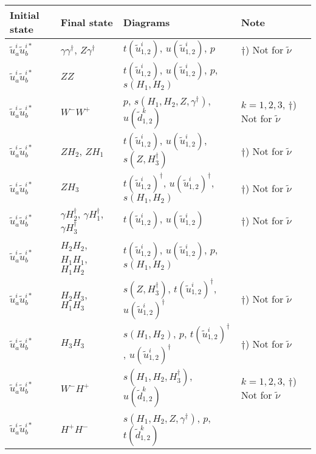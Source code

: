 {\small
\begin{center}
\begin{tabular}{llll} \hline
{\bfseries Initial state} & {\bfseries Final state} &
{\bfseries Diagrams} & {\bfseries Note} \\ \hline \tabspace
$\tilde{u}^i_a \tilde{u}^{i*}_{b}$ & $\gamma \gamma^\dagger$, $Z \gamma^\dagger$ &
$t(\tilde{u}^i_{1,2})$, $u(\tilde{u}^i_{1,2})$, $p$
& $\dagger$) Not for $\tilde{\nu}$ \\
$\tilde{u}^i_a\tilde{u}^{i*}_b$ & $Z Z$ &
$t(\tilde{u}^i_{1,2})$, $u(\tilde{u}^i_{1,2})$, $p$, $s(H_{1},H_{2})$ \\
$\tilde{u}^i_a\tilde{u}^{i*}_b$ & $W^-W^+$ &
$p$, $s(H_{1},H_{2},Z,\gamma^\dagger)$, $u(\tilde{d}^k_{1,2})$ 
& \parbox[t]{4cm}{$k=1,2,3$, $\dagger$) Not for $\tilde{\nu}$} \\
$\tilde{u}^i_a\tilde{u}^{i*}_b$ & $Z H_{2}$, $Z H_{1}$ &
$t(\tilde{u}^i_{1,2})$, $u(\tilde{u}^i_{1,2})$, $s(Z,H_3^\dagger)$
& $\dagger$) Not for $\tilde{\nu}$ \\
$\tilde{u}^i_a\tilde{u}^{i*}_b$ & $Z H_{3}$ &
$t(\tilde{u}^i_{1,2})^\dagger$, $u(\tilde{u}^i_{1,2})^\dagger$, $s(H_{1},H_{2})$
& $\dagger$) Not for $\tilde{\nu}$ \\
$\tilde{u}^i_a\tilde{u}^{i*}_b$ & $\gamma H_{2}^\dagger$, $\gamma H_{1}^\dagger$, $\gamma H_{3}^\dagger$ &
$t(\tilde{u}^i_{1,2})$, $u(\tilde{u}^i_{1,2})$ 
& $\dagger$) Not for $\tilde{\nu}$ \\
$\tilde{u}^i_a\tilde{u}^{i*}_b$ & $H_{2} H_{2}$, $H_{1} H_{1}$, 
$H_{1} H_{2}$ &
$t(\tilde{u}^i_{1,2})$, $u(\tilde{u}^i_{1,2})$, $p$, $s(H_{1},H_{2})$ \\
$\tilde{u}^i_a\tilde{u}^{i*}_b$ & $H_{2} H_{3}$, $H_{1} H_{3}$ &
$s(Z,H_3^\dagger)$, $t(\tilde{u}^i_{1,2})^\dagger$, $u(\tilde{u}^i_{1,2})^\dagger$
& $\dagger$) Not for $\tilde{\nu}$ \\
$\tilde{u}^i_a\tilde{u}^{i*}_b$ & $H_{3} H_{3}$ &
$s(H_{1},H_{2})$, $p$, $t(\tilde{u}^i_{1,2})^\dagger$, $u(\tilde{u}^i_{1,2})^\dagger$
& $\dagger$) Not for $\tilde{\nu}$ \\
$\tilde{u}^i_a\tilde{u}^{i*}_b$ & $W^- H^+$ &
$s(H_{1},H_{2},H_3^\dagger)$, $u(\tilde{d}^k_{1,2})$
& \parbox[t]{4cm}{$k=1,2,3$, $\dagger$) Not for $\tilde{\nu}$} \\
$\tilde{u}^i_a\tilde{u}^{i*}_b$ & $H^+ H^-$ &
$s(H_{1},H_{2},Z,\gamma^\dagger)$, $p$, $t(\tilde{d}^k_{1,2})$

\end{tabular}
\end{center}}
